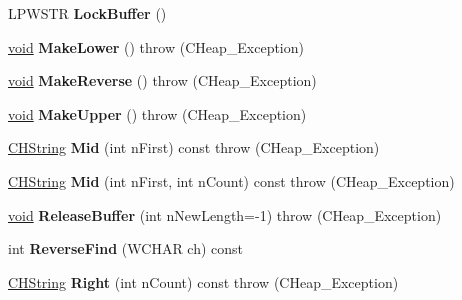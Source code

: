 \begin{DoxyCompactItemize}
\mbox{\label{class_c_h_string_a5df800acc0013a848eb6417316172b63}} 
L\+P\+W\+S\+TR {\bfseries Lock\+Buffer} ()
\item 
\mbox{\label{class_c_h_string_a6ddd0f453e1fd48fd82038c493b6ef3a}} 
\hyperlink{interfacevoid}{void} {\bfseries Make\+Lower} ()  throw (\+C\+Heap\+\_\+\+Exception)
\item 
\mbox{\label{class_c_h_string_a7f1252272274e90b604611bf82ac1ec2}} 
\hyperlink{interfacevoid}{void} {\bfseries Make\+Reverse} ()  throw (\+C\+Heap\+\_\+\+Exception)
\item 
\mbox{\label{class_c_h_string_a5f600353d77190ee428d8aa8dffdbf13}} 
\hyperlink{interfacevoid}{void} {\bfseries Make\+Upper} ()  throw (\+C\+Heap\+\_\+\+Exception)
\item 
\mbox{\label{class_c_h_string_a887fa6ce02ba039b63d2defba4b25f96}} 
\hyperlink{class_c_h_string}{C\+H\+String} {\bfseries Mid} (int n\+First) const  throw (\+C\+Heap\+\_\+\+Exception)
\item 
\mbox{\label{class_c_h_string_aff33849d5032841bc89017a96f5c9e74}} 
\hyperlink{class_c_h_string}{C\+H\+String} {\bfseries Mid} (int n\+First, int n\+Count) const  throw (\+C\+Heap\+\_\+\+Exception)
\item 
\mbox{\label{class_c_h_string_a610a723ecace8cb109167671f7f2d16f}} 
\hyperlink{interfacevoid}{void} {\bfseries Release\+Buffer} (int n\+New\+Length=-\/1)  throw (\+C\+Heap\+\_\+\+Exception)
\item 
\mbox{\label{class_c_h_string_af91e1676ad68374efeffad4534d9e35f}} 
int {\bfseries Reverse\+Find} (W\+C\+H\+AR ch) const
\item 
\mbox{\label{class_c_h_string_a76e9ab8fcb14ff97de01364b16c0bd35}} 
\hyperlink{class_c_h_string}{C\+H\+String} {\bfseries Right} (int n\+Count) const  throw (\+C\+Heap\+\_\+\+Exception)
\item 
\mbox{\label{class_c_h_string_af24a037892d8c98b2c69036d9769876f}} 

\end{DoxyCompactItemize}
